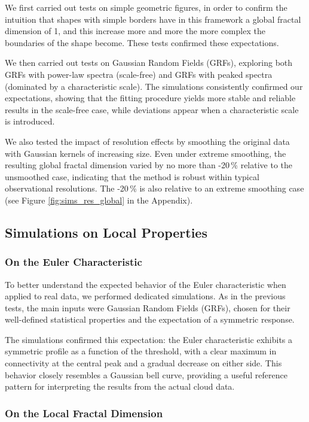 We first carried out tests on simple geometric figures, in order to confirm the intuition that shapes with simple borders have in this framework a global fractal dimension of 1, and this increase more and more the more complex the boundaries of the shape become. These tests confirmed these expectations.

We then carried out tests on Gaussian Random Fields (GRFs), exploring both GRFs with power-law spectra (scale-free) and GRFs with peaked spectra (dominated by a characteristic scale).  
The simulations consistently confirmed our expectations, showing that the fitting procedure yields more stable and reliable results in the scale-free case, while deviations appear when a characteristic scale is introduced.

We also tested the impact of resolution effects by smoothing the original data with Gaussian kernels of increasing size.  
Even under extreme smoothing, the resulting global fractal dimension varied by no more than -20\,\% relative to the unsmoothed case, indicating that the method is robust within typical observational resolutions. The -20\,\% is also relative to an extreme smoothing case (see Figure \ref{fig:sims_res_global} in the Appendix).

\subsection{Simulations on Local Properties}

\subsubsection{On the Euler Characteristic}

To better understand the expected behavior of the Euler characteristic when applied to real data, we performed dedicated simulations.  
As in the previous tests, the main inputs were Gaussian Random Fields (GRFs), chosen for their well-defined statistical properties and the expectation of a symmetric response.  

The simulations confirmed this expectation: the Euler characteristic exhibits a symmetric profile as a function of the threshold, with a clear maximum in connectivity at the central peak and a gradual decrease on either side.  
This behavior closely resembles a Gaussian bell curve, providing a useful reference pattern for interpreting the results from the actual cloud data.

\subsubsection{On the Local Fractal Dimension}

